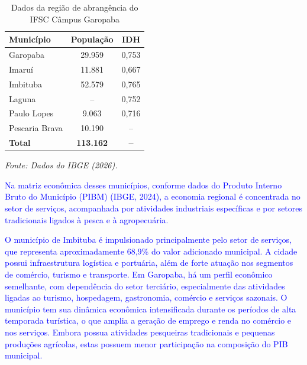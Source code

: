 \documentclass{../../modelos/latex-shared/ifsc-ppc}
\newcommand{\revisao}[1]{\textcolor{blue}{#1}}
\newcommand{\revisao}[1]{#1}
\begin{document}
\renewcommand{\tablename}{Tabela}
\setcounter{table}{0} %
\begin{table}[H]
\centering
\small
\caption{Dados da região de abrangência do IFSC Câmpus Garopaba}
\label{tab:dados-regiao-garopaba}
\vspace{0.2cm}
\begin{tabularx}{\linewidth}{Xcc}
\hline
\rowcolor{ifscgreen!20}
\textbf{Município} & \textbf{População} & \textbf{IDH} \\ \hline
Garopaba & 29.959 & 0,753 \\
Imaruí & 11.881 & 0,667 \\
Imbituba & 52.579 & 0,765 \\
Laguna & -- & 0,752 \\
Paulo Lopes & 9.063 & 0,716 \\
Pescaria Brava & 10.190 & -- \\ \hline
\rowcolor{cinzaTabela}
\textbf{Total} & \textbf{113.162} & \textbf{--} \\ \hline
\end{tabularx}
\vspace{0.1cm}
\begin{flushleft}
\footnotesize \textit{Fonte: Dados do IBGE (2026).}
\end{flushleft}
\end{table}
\renewcommand{\tablename}{Quadro}
\setcounter{table}{2} %

\revisao{Na matriz econômica desses municípios, conforme dados do Produto Interno Bruto do Município (PIBM) (IBGE, 2024), a economia regional é concentrada no setor de serviços, acompanhada por atividades industriais específicas e por setores tradicionais ligados à pesca e à agropecuária.}

\revisao{O município de Imbituba é impulsionado principalmente pelo setor de serviços, que representa aproximadamente 68,9\% do valor adicionado municipal. A cidade possui infraestrutura logística e portuária, além de forte atuação nos segmentos de comércio, turismo e transporte. Em Garopaba, há um perfil econômico semelhante, com dependência do setor terciário, especialmente das atividades ligadas ao turismo, hospedagem, gastronomia, comércio e serviços sazonais. O município tem sua dinâmica econômica intensificada durante os períodos de alta temporada turística, o que amplia a geração de emprego e renda no comércio e nos serviços. Embora possua atividades pesqueiras tradicionais e pequenas produções agrícolas, estas possuem menor participação na composição do PIB municipal.}
\end{document}
